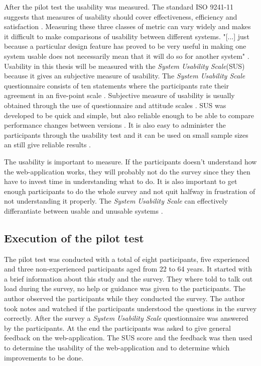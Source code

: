 After the pilot test the usability was measured. The standard ISO 9241-11 suggests that measures of usability should cover effectiveness, efficiency and satisfaction \citep{ISO1998}. Measuring these three classes of metric can vary widely and makes it difficult to make comparisons of usability between different systems. "[...] just because a particular design feature has proved to be very useful in making one system usable does not necessarily mean that it will do so for another system" \citep{Brooke1996}. Usability in this thesis will be measured with the \textit{System Usability Scale}(SUS) because it gives an subjective measure of usability. The \textit{System Usability Scale} questionnaire consists of ten statements where the participants rate their agreement in an five-point scale \citep{Ben2009}. Subjective measure of usability is usually obtained through the use of questionnaire and attitude scales \citep{Brooke1996}. SUS was developed to be quick and simple, but also reliable enough to be able to compare performance changes between versions \citep{Brooke1996}. It is also easy to administer the participants through the usability test and it can be used on small sample sizes an still give reliable results \citep{Affairs2013}.  

The usability is important to measure. If the participants doesn't understand how the web-application works, they will probably not do the survey since they then have to invest time in understanding what to do. %
It is also important to get enough participants to do the whole survey and not quit halfway in frustration of not understanding it properly. The \textit{System Usability Scale} can effectively differantiate between usable and unusable systems \citep{Affairs2013}. 

\subsection{Execution of the pilot test}
The pilot test was conducted with a total of eight participants, five experienced and three non-experienced participants aged from 22 to 64 years. It started with a brief information about this study and the survey. They where told to talk out load during the survey, no help or guidance was given to the participants. The author observed the participants while they conducted the survey. The author took notes and watched if the participants understood the questions in the survey correctly. After the survey a \textit{System Usability Scale} questionnaire was answered by the participants. At the end the participants was asked to give general feedback on the web-application. The SUS score and the feedback was then used to determine the usability of the web-application and to determine which improvements to be done.  

